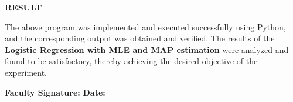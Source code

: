 \documentclass[11pt,twoside]{article}
\newcommand{\expheading}[1]{{\fontsize{14}{17}\selectfont\textbf{#1}\par}}
\newcommand{\tooddpage}{\clearpage\ifodd\value{page}\else\null\thispagestyle{empty}\newpage\fi}
\begin{document}
\tooddpage
\expheading{RESULT}
\vspace{4pt}
{\fontsize{12}{15}\selectfont
The above program was implemented and executed successfully using Python, and the corresponding output was obtained and verified. The results of the \textbf{Logistic Regression with MLE and MAP estimation} were analyzed and found to be satisfactory, thereby achieving the desired objective of the experiment.\par
}

\vspace{12pt}

\noindent\textbf{Faculty Signature:} \underline{\hspace{3.6cm}} \hfill \textbf{Date:} \underline{\hspace{2.8cm}}\par

\tooddpage
\end{document}
